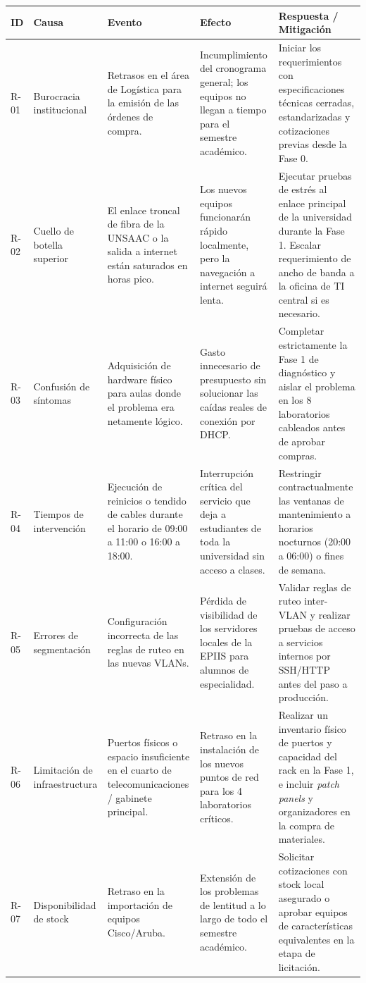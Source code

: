 	\begin{longtable}{C{1cm}T{2.2cm}T{2.8cm}T{2.8cm}T{4.4cm}}
		\hline
		\textbf{ID} & \textbf{Causa} & \textbf{Evento} & \textbf{Efecto} & \textbf{Respuesta / Mitigación} \bigstrut\\
		\hline
		\endhead
		R-01 & Burocracia institucional & Retrasos en el área de Logística para la emisión de las órdenes de compra. & Incumplimiento del cronograma general; los equipos no llegan a tiempo para el semestre académico. & Iniciar los requerimientos con especificaciones técnicas cerradas, estandarizadas y cotizaciones previas desde la Fase 0. \\
		R-02 & Cuello de botella superior & El enlace troncal de fibra de la UNSAAC o la salida a internet están saturados en horas pico. & Los nuevos equipos funcionarán rápido localmente, pero la navegación a internet seguirá lenta. & Ejecutar pruebas de estrés al enlace principal de la universidad durante la Fase 1. Escalar requerimiento de ancho de banda a la oficina de TI central si es necesario. \\
		R-03 & Confusión de síntomas & Adquisición de hardware físico para aulas donde el problema era netamente lógico. & Gasto innecesario de presupuesto sin solucionar las caídas reales de conexión por DHCP. & Completar estrictamente la Fase 1 de diagnóstico y aislar el problema en los 8 laboratorios cableados antes de aprobar compras. \\
		R-04 & Tiempos de intervención & Ejecución de reinicios o tendido de cables durante el horario de 09:00 a 11:00 o 16:00 a 18:00. & Interrupción crítica del servicio que deja a estudiantes de toda la universidad sin acceso a clases. & Restringir contractualmente las ventanas de mantenimiento a horarios nocturnos (20:00 a 06:00) o fines de semana. \\
		R-05 & Errores de segmentación & Configuración incorrecta de las reglas de ruteo en las nuevas VLANs. & Pérdida de visibilidad de los servidores locales de la EPIIS para alumnos de especialidad. & Validar reglas de ruteo inter-VLAN y realizar pruebas de acceso a servicios internos por SSH/HTTP antes del paso a producción. \\
		R-06 & Limitación de infraestructura & Puertos físicos o espacio insuficiente en el cuarto de telecomunicaciones / gabinete principal. & Retraso en la instalación de los nuevos puntos de red para los 4 laboratorios críticos. & Realizar un inventario físico de puertos y capacidad del rack en la Fase 1, e incluir \textit{patch panels} y organizadores en la compra de materiales. \\
		R-07 & Disponibilidad de stock & Retraso en la importación de equipos Cisco/Aruba. & Extensión de los problemas de lentitud a lo largo de todo el semestre académico. & Solicitar cotizaciones con stock local asegurado o aprobar equipos de características equivalentes en la etapa de licitación. \\
		\hline
	\end{longtable}
